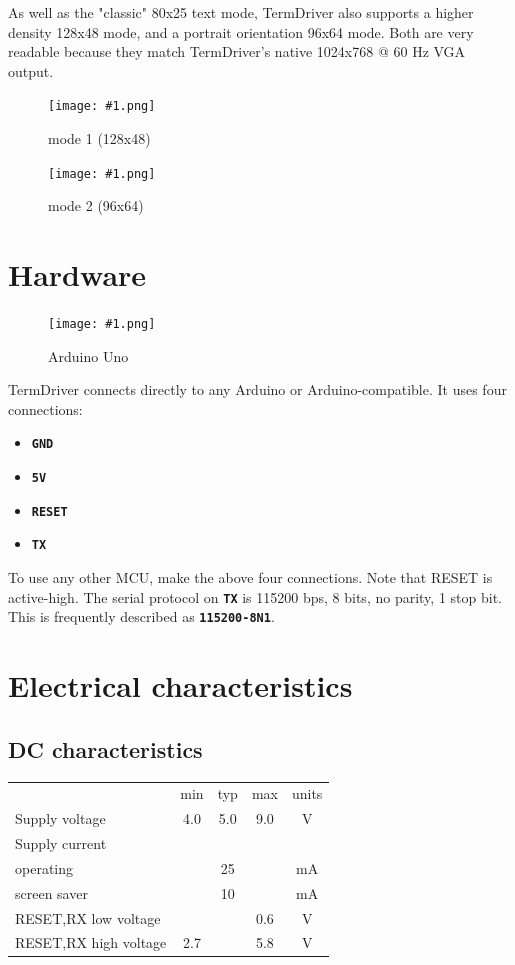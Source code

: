 \documentclass{article}
\newcommand{\heavyline}{\specialrule{1pt}{1pt}{1pt}}
\newcommand{\png}[2]{
\begin{figure}[H]
\begin{center}
\texttt{[image: \#1.png]}
\caption{#2}
\end{center}
\end{figure}
}
\newcommand{\mach}[1]{\texttt{\textbf{#1}}}
\begin{document}
As well as the "classic" 80x25 text mode,
TermDriver also supports a higher density 128x48 mode,
and a portrait orientation 96x64 mode.
Both are very readable because
they match TermDriver's native 1024x768 @ 60 Hz VGA output.

\png{img/moby1}{mode 1 (128x48)}
\png{img/moby2}{mode 2 (96x64)}

\newpage
\section{Hardware}

\png{img/arduino}{Arduino Uno}

TermDriver connects directly to any Arduino or Arduino-compatible.
It uses four connections:

\begin{itemize}
\item \mach{GND}
\item \mach{5V}
\item \mach{RESET}
\item \mach{TX}
\end{itemize}

\noindent
To use any other MCU, make the above four connections. Note that RESET is active-high.
The serial protocol on \mach{TX} is 115200 bps, 8 bits, no parity, 1 stop bit.
This is frequently described as \mach{115200-8N1}.

\newpage
\hypertarget{technical-specifications}{}
\hypertarget{technical-specifications}{%
\section{Electrical characteristics}\label{electrical-characteristics}}

\subsection{DC characteristics}
\vspace{10 pt}
{\renewcommand{\arraystretch}{1.2}%

\begin{tabularx}{\linewidth}{Xcccc}
\heavyline
& min & typ & max & units \\ \heavyline

Supply voltage & 4.0 & 5.0 & 9.0 & V \\ \hline

Supply current & & & & \\
\hspace{10pt} operating & & 25 & & mA \\
\hspace{10pt} screen saver & & 10 & & mA \\ \hline

RESET,RX low voltage & & & 0.6 & V \\ \hline
RESET,RX high voltage & 2.7 &   & 5.8 & V \\ \hline
\end{tabularx}}
\vspace{10 pt}
\end{document}
